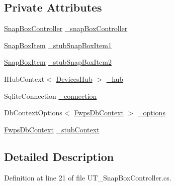 \subsection*{Private Attributes}
\begin{DoxyCompactItemize}
\item 
\mbox{\hyperlink{class_f_w_p_s_1_1_controllers_1_1_snap_box_controller}{Snap\+Box\+Controller}} \mbox{\hyperlink{class_web_api_1_1_unit_1_1_test_1_1_controller_tests_1_1_u_t___snap_box_controller_ad78274cf60f73303bf6f3bdf28ef67a6}{\+\_\+snap\+Box\+Controller}}
\item 
\mbox{\hyperlink{class_f_w_p_s_1_1_models_1_1_snap_box_item}{Snap\+Box\+Item}} \mbox{\hyperlink{class_web_api_1_1_unit_1_1_test_1_1_controller_tests_1_1_u_t___snap_box_controller_afd4e5f0327b2543d5a81133372c05f66}{\+\_\+stub\+Snap\+Box\+Item1}}
\item 
\mbox{\hyperlink{class_f_w_p_s_1_1_models_1_1_snap_box_item}{Snap\+Box\+Item}} \mbox{\hyperlink{class_web_api_1_1_unit_1_1_test_1_1_controller_tests_1_1_u_t___snap_box_controller_a7c979410aa7898ce17acbe68706a898b}{\+\_\+stub\+Snap\+Box\+Item2}}
\item 
I\+Hub\+Context$<$ \mbox{\hyperlink{class_f_w_p_s_1_1_devices_hub}{Devices\+Hub}} $>$ \mbox{\hyperlink{class_web_api_1_1_unit_1_1_test_1_1_controller_tests_1_1_u_t___snap_box_controller_aff4dbb4804fd9ed59434681e034c1840}{\+\_\+hub}}
\item 
Sqlite\+Connection \mbox{\hyperlink{class_web_api_1_1_unit_1_1_test_1_1_controller_tests_1_1_u_t___snap_box_controller_ae06be77aac44359b06a7e8778a5c2d73}{\+\_\+connection}}
\item 
Db\+Context\+Options$<$ \mbox{\hyperlink{class_f_w_p_s_1_1_data_1_1_fwps_db_context}{Fwps\+Db\+Context}} $>$ \mbox{\hyperlink{class_web_api_1_1_unit_1_1_test_1_1_controller_tests_1_1_u_t___snap_box_controller_a6e359f0b14e8a498d8eaefc6ba2badd2}{\+\_\+options}}
\item 
\mbox{\hyperlink{class_f_w_p_s_1_1_data_1_1_fwps_db_context}{Fwps\+Db\+Context}} \mbox{\hyperlink{class_web_api_1_1_unit_1_1_test_1_1_controller_tests_1_1_u_t___snap_box_controller_af6a80cc9ea859495c4c8f0e9abe27e9c}{\+\_\+stub\+Context}}
\end{DoxyCompactItemize}


\subsection{Detailed Description}


Definition at line 21 of file U\+T\+\_\+\+Snap\+Box\+Controller.\+cs.




